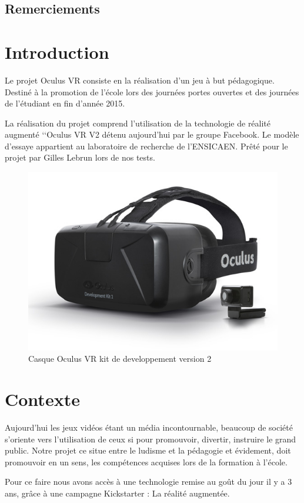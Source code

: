 \documentclass[a4paper,11pt]{myreport}
\begin{document}
\setlength{\textheight}{26cm}
\setlength{\topmargin}{-2cm}

\tableofcontents


\listoffigures
\section*{Remerciements}
\chapter{Introduction}
\par Le projet Oculus VR consiste en la réalisation d'un jeu à but pédagogique. Destiné à la promotion de l'école lors des journées portes ouvertes et des journées de l'étudiant en fin d'année 2015.
\par La réalisation du projet comprend l'utilisation de la technologie de réalité augmenté \lq\lq{Oculus VR V2} détenu aujourd'hui par le groupe Facebook. Le modèle d'essaye appartient au laboratoire de recherche de l'ENSICAEN. Prêté pour le projet par Gilles Lebrun lors de nos tests.
\begin{figure}[h]
	\includegraphics[scale=0.70]{./images/dk2-product.jpg}
	\caption{Casque Oculus VR kit de developpement version 2}
\end{figure}
\chapter{Contexte}
\par Aujourd'hui les jeux vidéos étant un média incontournable, beaucoup de société s'oriente vers l'utilisation de ceux si pour promouvoir, divertir, instruire le grand public. Notre projet ce situe entre le ludisme et la pédagogie et évidement, doit promouvoir en un sens, les compétences acquises lors de la formation à l'école.
\par Pour ce faire nous avons accès à une technologie remise au goût du jour il y a 3 ans, grâce à une campagne Kickstarter : La réalité augmentée.
\end{document}
